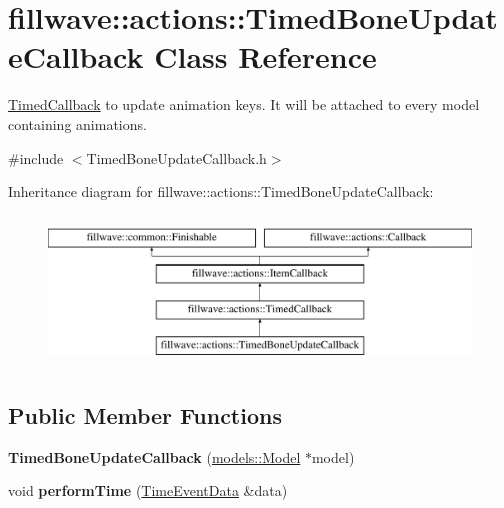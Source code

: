 \hypertarget{classfillwave_1_1actions_1_1TimedBoneUpdateCallback}{}\section{fillwave\+:\+:actions\+:\+:Timed\+Bone\+Update\+Callback Class Reference}
\label{classfillwave_1_1actions_1_1TimedBoneUpdateCallback}


\hyperlink{classfillwave_1_1actions_1_1TimedCallback}{Timed\+Callback} to update animation keys. It will be attached to every model containing animations.  




{\ttfamily \#include $<$Timed\+Bone\+Update\+Callback.\+h$>$}

Inheritance diagram for fillwave\+:\+:actions\+:\+:Timed\+Bone\+Update\+Callback\+:\begin{figure}[H]
\begin{center}
\leavevmode
\includegraphics[height=4.000000cm]{classfillwave_1_1actions_1_1TimedBoneUpdateCallback}
\end{center}
\end{figure}
\subsection*{Public Member Functions}
\begin{DoxyCompactItemize}
\item 
\hypertarget{classfillwave_1_1actions_1_1TimedBoneUpdateCallback_a3f2a8d52241fd3ae469bde06da66ec3e}{}{\bfseries Timed\+Bone\+Update\+Callback} (\hyperlink{classfillwave_1_1models_1_1Model}{models\+::\+Model} $\ast$model)\label{classfillwave_1_1actions_1_1TimedBoneUpdateCallback_a3f2a8d52241fd3ae469bde06da66ec3e}

\item 
\hypertarget{classfillwave_1_1actions_1_1TimedBoneUpdateCallback_af0e411eaf252f95ae3792f81e3af7175}{}void {\bfseries perform\+Time} (\hyperlink{structfillwave_1_1actions_1_1TimeEventData}{Time\+Event\+Data} \&data)\label{classfillwave_1_1actions_1_1TimedBoneUpdateCallback_af0e411eaf252f95ae3792f81e3af7175}

\end{DoxyCompactItemize}
